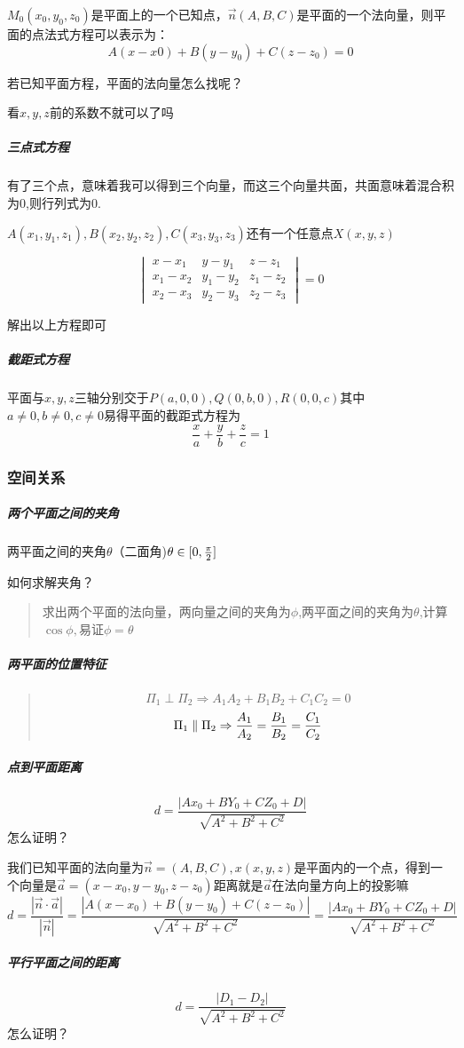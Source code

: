 \documentclass[UTF8]{ctexart}
\begin{document}
  $M_0(x_0,y_0,z_0)$是平面上的一个已知点，$\vec n(A,B,C)$是平面的一个法向量，则平面的点法式方程可以表示为：
  $$A(x-x0) + B(y - y_0) + C(z - z_0) = 0$$

  若已知平面方程，平面的法向量怎么找呢？  
  
  看$x,y,z$前的系数不就可以了吗

\subparagraph{三点式方程}

  有了三个点，意味着我可以得到三个向量，而这三个向量共面，共面意味着混合积为0,则行列式为0.

  $A(x_1,y_1,z_1),B(x_2,y_2,z_2),C(x_3,y_3,z_3)$还有一个任意点$X(x,y,z)$

  $$\begin{vmatrix}x-x_1&y-y_1&z-z_1\\x_1-x_2&y_1-y_2&z_1-z_2\\x_2-x_3&y_2-y_3&z_2-z_3\end{vmatrix} = 0$$

  解出以上方程即可

\subparagraph{截距式方程}

  平面与$x,y,z$三轴分别交于$P(a,0,0),Q(0,b,0),R(0,0,c)$其中$a\ne0,b\ne0,c\ne0$易得平面的截距式方程为
  $$\frac{x}{a}+\frac{y}{b}+\frac{z}{c} = 1$$

\subsubsection{空间关系}
\subparagraph{两个平面之间的夹角}
两平面之间的夹角$\theta$（二面角)$\theta \in [0,{\pi \over 2}]$

如何求解夹角？
\begin{quote}
   求出两个平面的法向量，两向量之间的夹角为$\phi$,两平面之间的夹角为$\theta$,计算$\cos \phi,易证\phi = \theta$
\end{quote}

\subparagraph{两平面的位置特征}

\begin{quote}
$$\Pi_1 \perp \Pi_2 \Rightarrow A_1A_2 + B_1B_2 + C_1C_2 = 0$$
$$\Pi_1 \parallel \Pi_2 \Rightarrow {A_1 \over A_2}={B_1 \over B_2}={C_1 \over C_2}$$
\end{quote}

\subparagraph{点到平面距离}$$d=\frac{|Ax_0+BY_0+CZ_0+D|}{\sqrt{A^2+B^2+C^2}}$$
  怎么证明？

      我们已知平面的法向量为$\vec n =(A,B,C),x(x,y,z)$是平面内的一个点，得到一个向量是$\vec a = (x-x_0,y-y_0,z-z_0)$距离就是$\vec a$在法向量方向上的投影嘛
      $$d = \frac{|\vec n \cdot \vec a |}{|\vec n|} = \frac {|A(x-x_0) + B(y-y_0) + C(z-z_0)|}{\sqrt{A^2+B^2+C^2}}=\frac{|Ax_0+BY_0+CZ_0+D|} {\sqrt{A^2+B^2+C^2}}$$
\subparagraph{平行平面之间的距离}$$d=\frac{|D_1-D_2|}{\sqrt{A^2+B^2+C^2}}$$
  怎么证明？
\end{document}
